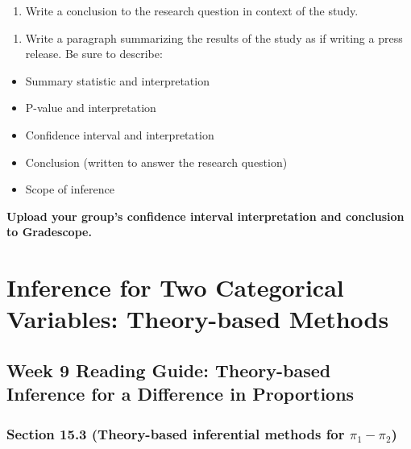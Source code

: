 \documentclass[
]{report}
\providecommand{\tightlist}{%
  \setlength{\itemsep}{0pt}\setlength{\parskip}{0pt}}
\begin{document}
\begin{enumerate}
\def\labelenumi{\arabic{enumi}.}
\setcounter{enumi}{10}
\tightlist
\item
  Write a conclusion to the research question in context of the study.
\end{enumerate}

\vspace{0.8in}

\begin{enumerate}
\def\labelenumi{\arabic{enumi}.}
\setcounter{enumi}{11}
\tightlist
\item
  Write a paragraph summarizing the results of the study as if writing a press release. Be sure to describe:
\end{enumerate}

\begin{itemize}
\item
  Summary statistic and interpretation
\item
  P-value and interpretation
\item
  Confidence interval and interpretation
\item
  Conclusion (written to answer the research question)
\item
  Scope of inference
\end{itemize}

\textbf{Upload your group's confidence interval interpretation and conclusion to Gradescope.}

\newpage

\hypertarget{inference-for-two-categorical-variables-theory-based-methods}{%
\chapter{Inference for Two Categorical Variables: Theory-based Methods}\label{inference-for-two-categorical-variables-theory-based-methods}}

\hypertarget{week-9-reading-guide-theory-based-inference-for-a-difference-in-proportions}{%
\section{Week 9 Reading Guide: Theory-based Inference for a Difference in Proportions}\label{week-9-reading-guide-theory-based-inference-for-a-difference-in-proportions}}

\hypertarget{section-15.3-theory-based-inferential-methods-for-pi_1---pi_2}{%
\subsection{\texorpdfstring{Section 15.3 (Theory-based inferential methods for \(\pi_1 - \pi_2\))}{Section 15.3 (Theory-based inferential methods for \textbackslash pi\_1 - \textbackslash pi\_2)}}\label{section-15.3-theory-based-inferential-methods-for-pi_1---pi_2}}
\end{document}
